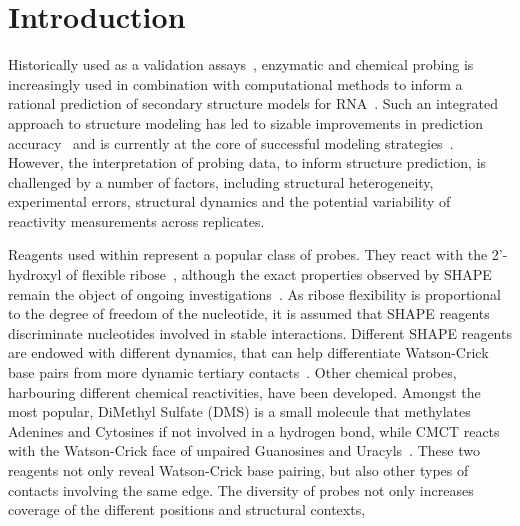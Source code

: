 \documentclass[a4,center,fleqn]{NAR}
\begin{document}


\section*{Introduction}


Historically used as a validation assays~\cite{Knapp1989}, enzymatic and chemical probing  is increasingly used in combination with computational methods to inform a rational prediction of secondary structure models for RNA~\cite{Mathews2004}. Such an integrated approach to structure modeling has led to sizable improvements in prediction accuracy~\cite{Washietl2012} and is currently at the core of successful modeling strategies~\cite{Miao2017}. However, the interpretation of probing data, to inform structure prediction, is challenged by a number of factors, including structural heterogeneity, experimental errors, structural dynamics and the potential variability of reactivity measurements across replicates. 

Reagents used within  represent a popular class of probes. They react with the 2’-hydroxyl of flexible ribose~\cite{McGinnis2012}, although the exact properties observed by SHAPE remain the object of ongoing investigations~\cite{McGinnis2012,Sexton2017,Hurst2018,Mlynsky2018,Frezza2019,Busan2019}.
As ribose flexibility is proportional to the degree of freedom of the nucleotide, it is assumed that SHAPE reagents discriminate nucleotides involved in stable interactions. Different SHAPE reagents are endowed with different dynamics, that can help differentiate Watson-Crick base pairs from more dynamic tertiary contacts~\cite{Gherghe2008,Steen2012,Rice2014,Busan2019}. Other chemical probes, harbouring different chemical reactivities, have been developed. Amongst the most popular, DiMethyl Sulfate (DMS) is a small molecule that methylates Adenines and Cytosines if not involved in a hydrogen bond, while   CMCT reacts with the Watson-Crick face of unpaired Guanosines and Uracyls~\cite{Ehresmann1987,Brunel2000}. These two reagents not only reveal Watson-Crick base pairing, but also other types of contacts involving the same edge. The diversity of probes not only increases coverage of the different positions and structural contexts, 
\end{document}
